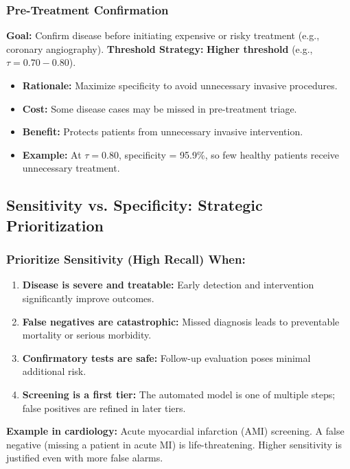 \documentclass[11pt]{article}
\begin{document}
\subsubsection{Pre-Treatment Confirmation}

\textbf{Goal:} Confirm disease before initiating expensive or risky treatment (e.g., coronary angiography).
\textbf{Threshold Strategy:} \textbf{Higher threshold} (e.g., $\tau = 0.70-0.80$).

\begin{itemize}
    \item \textbf{Rationale:} Maximize specificity to avoid unnecessary invasive procedures.
    \item \textbf{Cost:} Some disease cases may be missed in pre-treatment triage.
    \item \textbf{Benefit:} Protects patients from unnecessary invasive intervention.
    \item \textbf{Example:} At $\tau = 0.80$, specificity = 95.9\%, so few healthy patients receive unnecessary treatment.
\end{itemize}

\subsection{Sensitivity vs. Specificity: Strategic Prioritization}

\subsubsection{Prioritize Sensitivity (High Recall) When:}

\begin{enumerate}
    \item \textbf{Disease is severe and treatable:} Early detection and intervention significantly improve outcomes.
    \item \textbf{False negatives are catastrophic:} Missed diagnosis leads to preventable mortality or serious morbidity.
    \item \textbf{Confirmatory tests are safe:} Follow-up evaluation poses minimal additional risk.
    \item \textbf{Screening is a first tier:} The automated model is one of multiple steps; false positives are refined in later tiers.
\end{enumerate}

\textbf{Example in cardiology:} Acute myocardial infarction (AMI) screening. A false negative (missing a patient in acute MI) is life-threatening. Higher sensitivity is justified even with more false alarms.
\end{document}
